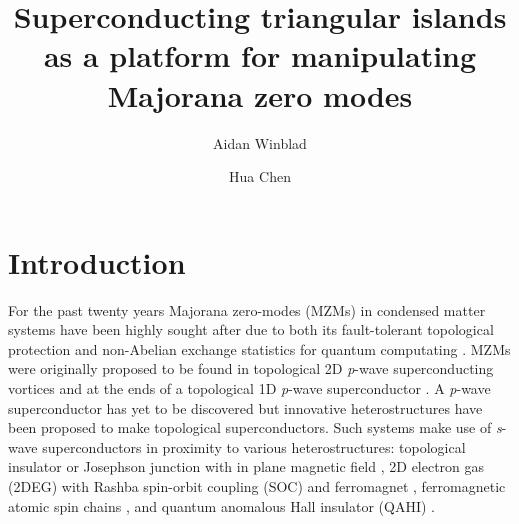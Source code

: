 \documentclass[aps,prb,showpacs,amsmath,amssymb,superscriptaddress]{revtex4-2}
\begin{document}
\title{Superconducting triangular islands as a platform for manipulating Majorana zero modes}

\author{Aidan Winblad}

\author{Hua Chen}

\maketitle

\section{Introduction}
For the past twenty years Majorana zero-modes (MZMs) in condensed matter systems have been highly sought after due to both its fault-tolerant topological protection and non-Abelian exchange statistics for quantum computating \cite{ivanovNonAbelianStatisticsHalfQuantum2001, kitaevFaulttolerantQuantumComputation2003, nayakNonAbelianAnyonsTopological2008, aliceaNonAbelianStatisticsTopological2011, aasenMilestonesMajoranaBasedQuantum2016}.
MZMs were originally proposed to be found in topological 2D \textit{p}-wave superconducting vortices and at the ends of a topological 1D \textit{p}-wave superconductor \cite{readPairedStatesFermions2000, kitaevUnpairedMajoranaFermions2001}.
A \textit{p}-wave superconductor has yet to be discovered but innovative heterostructures have been proposed to make topological superconductors.
Such systems make use of \textit{s}-wave superconductors in proximity to various heterostructures: topological insulator \cite{fuSuperconductingProximityEffect2008, hosurMajoranaModesEnds2011, potterEngineeringMathitipSuperconductor2011, veldhorstMagnetotransportInducedSuperconductivity2013} or Josephson junction with in plane magnetic field \cite{black-schafferMajoranaFermionsSpinorbitcoupled2011, pientkaSignaturesTopologicalPhase2013, hellTwoDimensionalPlatformNetworks2017, scharfTuningTopologicalSuperconductivity2019}, 2D electron gas (2DEG) with Rashba spin-orbit coupling (SOC) and ferromagnet \cite{oregHelicalLiquidsMajorana2010, sauGenericNewPlatform2010, lutchynSearchMajoranaFermions2011, potterTopologicalSuperconductivityMajorana2012, nadj-pergeProposalRealizingMajorana2013}, ferromagnetic atomic spin chains \cite{choyMajoranaFermionsEmerging2011, brauneckerInterplayClassicalMagnetic2013, klinovajaTopologicalSuperconductivityMajorana2013}, and quantum anomalous Hall insulator (QAHI) \cite{chenQuasionedimensionalQuantumAnomalous2018, zengQuantumAnomalousHall2018, xieCreatingLocalizedMajorana2021}.
\end{document}
